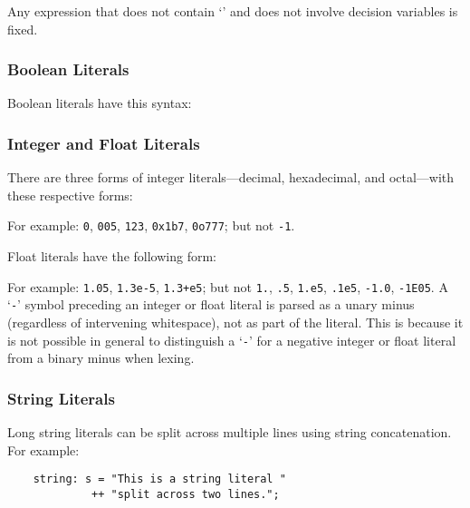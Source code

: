 \documentclass[10pt]{scrartcl}
\newcommand{\underscore}{\texttt{\n{}}}
\begin{document}
Any expression that does not contain `\underscore' and does not involve
decision variables is fixed.

\subsubsection{Boolean Literals}
Boolean literals have this syntax:
\begin{productions}
    \RuleBoolLiteral
\end{productions}

\subsubsection{Integer and Float Literals}
There are three forms of integer literals---decimal, hexadecimal, and
octal---with these respective forms:
\begin{productions}
    \RuleIntLiteral
\end{productions}
For example: \texttt{0}, \texttt{005}, \texttt{123}, \texttt{0x1b7},
\texttt{0o777};  but not \texttt{-1}.

Float literals have the following form:
\begin{productions}
    \RuleFloatLiteral
\end{productions}
For example: \texttt{1.05}, \texttt{1.3e-5}, \texttt{1.3+e5};  but not
\texttt{1.}, \texttt{.5}, \texttt{1.e5}, \texttt{.1e5}, \texttt{-1.0},
\texttt{-1E05}.
A `\texttt{-}' symbol preceding an integer or float literal is parsed as a
unary minus (regardless of intervening whitespace), not as part of the
literal.  This is because it is not possible in general to distinguish a
`\texttt{-}' for a negative integer or float literal from a binary minus
when lexing.

\subsubsection{String Literals}
\CommonStringLiterals{}
Long string literals can be split across multiple lines using string
concatenation.  For example:
\begin{verbatim}
    string: s = "This is a string literal "
             ++ "split across two lines.";
\end{verbatim}
\end{document}
